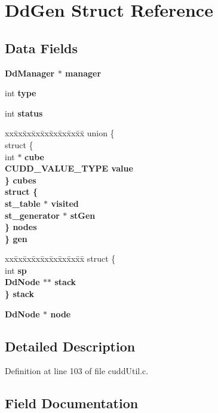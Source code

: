 \section{Dd\-Gen Struct Reference}
\label{structDdGen}
\subsection*{Data Fields}
\begin{CompactItemize}
\item 
\bf{Dd\-Manager} $\ast$ \bf{manager}
\item 
int \bf{type}
\item 
int \bf{status}
\item 
\begin{tabbing}
xx\=xx\=xx\=xx\=xx\=xx\=xx\=xx\=xx\=\kill
union \{\\
\>struct \{\\
\>\>int $\ast$ \bf{cube}\\
\>\>CUDD\_VALUE\_TYPE \bf{value}\\
\>\} \bf{cubes}\\
\>struct \{\\
\>\>\bf{st\_table} $\ast$ \bf{visited}\\
\>\>\bf{st\_generator} $\ast$ \bf{stGen}\\
\>\} \bf{nodes}\\
\} \bf{gen}\\

\end{tabbing}\item 
\begin{tabbing}
xx\=xx\=xx\=xx\=xx\=xx\=xx\=xx\=xx\=\kill
struct \{\\
\>int \bf{sp}\\
\>\bf{DdNode} $\ast$$\ast$ \bf{stack}\\
\} \bf{stack}\\

\end{tabbing}\item 
\bf{Dd\-Node} $\ast$ \bf{node}
\end{CompactItemize}


\subsection{Detailed Description}




Definition at line 103 of file cudd\-Util.c.

\subsection{Field Documentation}
